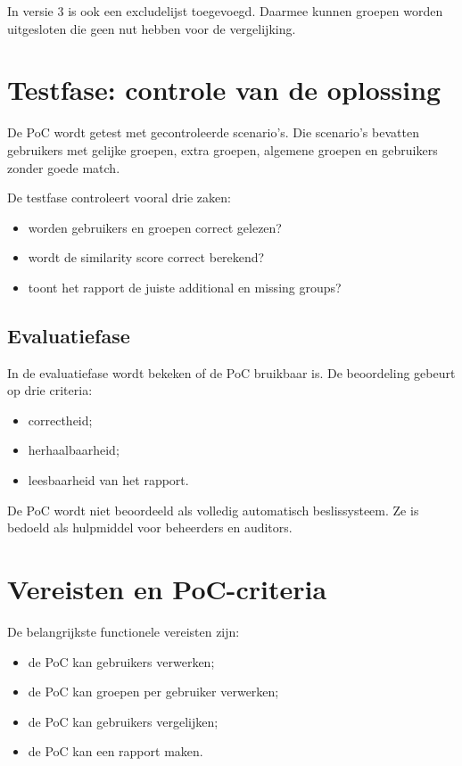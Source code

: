 In versie 3 is ook een excludelijst toegevoegd. Daarmee kunnen groepen worden uitgesloten die geen nut hebben voor de vergelijking.

\section{Testfase: controle van de oplossing}

De PoC wordt getest met gecontroleerde scenario's. Die scenario's bevatten gebruikers met gelijke groepen, extra groepen, algemene groepen en gebruikers zonder goede match.

De testfase controleert vooral drie zaken:

\begin{itemize}
	\item worden gebruikers en groepen correct gelezen?
	\item wordt de similarity score correct berekend?
	\item toont het rapport de juiste additional en missing groups?
\end{itemize}

\subsection*{Evaluatiefase}

In de evaluatiefase wordt bekeken of de PoC bruikbaar is. De beoordeling gebeurt op drie criteria:

\begin{itemize}
	\item correctheid;
	\item herhaalbaarheid;
	\item leesbaarheid van het rapport.
\end{itemize}

De PoC wordt niet beoordeeld als volledig automatisch beslissysteem. Ze is bedoeld als hulpmiddel voor beheerders en auditors.

\section{Vereisten en PoC-criteria}

De belangrijkste functionele vereisten zijn:

\begin{itemize}
	\item de PoC kan gebruikers verwerken;
	\item de PoC kan groepen per gebruiker verwerken;
	\item de PoC kan gebruikers vergelijken;
	\item de PoC kan een rapport maken.
\end{itemize}

